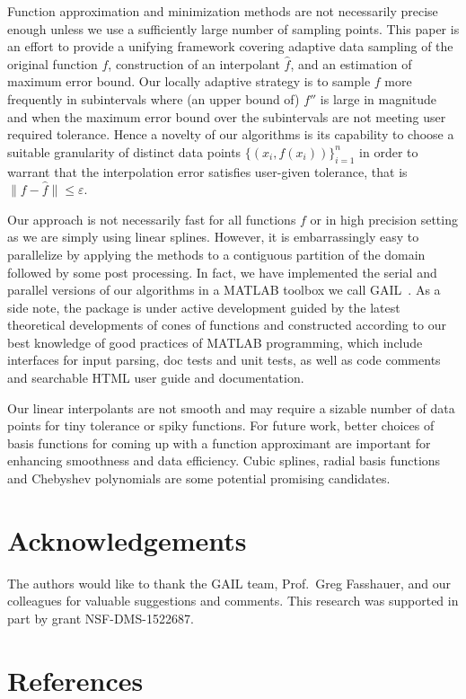 \documentclass[review]{elsarticle}
\newcommand{\abstol}{\varepsilon}
\theoremstyle{definition}
\begin{document}
Function approximation and minimization methods are not necessarily precise
enough unless we use a sufficiently large number of sampling points. This paper
is an effort to provide a unifying framework covering adaptive data sampling of
the original function $f$, construction of an interpolant $\hat{f}$, and an
estimation of maximum error bound. Our locally adaptive strategy is to sample
$f$ more frequently in subintervals where (an upper bound of) $f''$ is large in
magnitude and when the maximum error bound over the subintervals are not meeting
user required tolerance. Hence a novelty of our algorithms is its capability to
choose a suitable granularity of distinct data points $\{(x_i,
f(x_i))\}_{i=1}^n$ in order to warrant that the interpolation error satisfies
user-given tolerance, that is $\| f - \hat{f} \| \le \abstol$.

Our approach is not necessarily fast for all functions $f$ or in high precision
setting as we are simply using linear splines. However, it is embarrassingly
easy to parallelize by applying the methods to a contiguous partition of the
domain followed by some post processing. In fact, we have implemented the serial
and parallel versions of our algorithms in a MATLAB toolbox we call
GAIL~\cite{ChoEtal15a}. As a side note, the package is under active development
guided by the latest theoretical developments of cones of functions and
constructed according to our best knowledge of good practices of MATLAB
programming, which include interfaces for input parsing, doc tests and unit
tests, as well as code comments and searchable HTML user guide and
documentation.


Our linear interpolants are not smooth and may require a sizable number of data
points for tiny tolerance or spiky functions. For future work, better choices of
basis functions for coming up with a function approximant are important for
enhancing smoothness and data efficiency. Cubic splines, radial basis functions
and Chebyshev polynomials are some potential promising candidates.

\section*{Acknowledgements}
The authors would like to thank the GAIL team, Prof.\ Greg Fasshauer, and our colleagues for valuable suggestions and comments.  This research was supported in part by grant NSF-DMS-1522687.


\section*{References}


\end{document}
